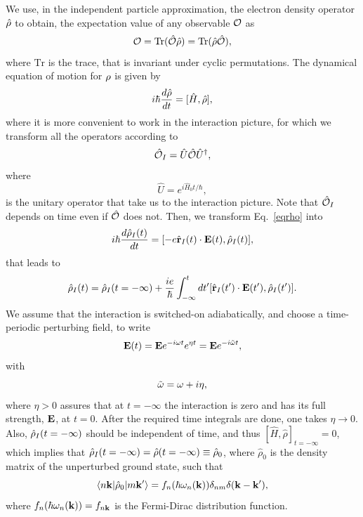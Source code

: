 \documentclass[floatfix,prb,aps,superscriptaddress,11pt,preprint]{revtex4}
\begin{document}
We use, in the independent particle approximation, the electron density
operator $\hat{{\rho}}$ to obtain, the expectation value of any observable
${\cal O}$ as
\begin{equation}\label{traza}
  {\cal O}=\mathrm{Tr}(\hat{{\cal O}}\hat\rho)=\mathrm{Tr}(\hat\rho\hat{{\cal O}}),
\end{equation}
where $\mathrm{Tr}$ is the trace, that is
invariant under cyclic permutations.
The dynamical equation of motion for ${\rho}$ is given by
\begin{equation}\label{eqrho}
i\hbar \frac{d\hat{{\rho}}}{dt}=[\hat{H},\hat{{\rho}}]
,
\end{equation}
where it is more convenient to work in the interaction picture, for
which we transform all the operators according to 
\begin{equation}\label{ip}
\hat{{\cal O}}_I=\hat{U}\hat{{\cal O}}\hat{U}^\dagger,
\end{equation}
where
\begin{equation}\label{ou}
\hat{U}=e^{i\hat{H}_0t/\hbar},
\end{equation}
is the unitary operator that take us to the interaction picture.
Note that $\hat{{\cal O}}_I$ depends on time even if $\hat{{\cal O}}$ does not.
Then, we transform Eq.~\eqref{eqrho} into
\begin{equation}\label{intrho}
i\hbar\frac{d\hat{{\rho}}_I(t)}{dt}=[-e\hat{\mathbf{r}}_I(t)\cdot\mathbf{E}(t),\hat{{\rho}}_I(t)],
\end{equation}
that leads to
\begin{equation}\label{intrho2}
\hat{{\rho}}_I(t)=\hat{{\rho}}_I(t=-\infty)
+
\frac{ie}{\hbar}\int_{-\infty}^t dt'[\hat{\mathbf{r}}_I(t')\cdot\mathbf{E}(t'),\hat{{\rho}}_I(t')].
\end{equation}
We assume that the interaction is switched-on adiabatically, and
choose a time-periodic perturbing field, to write
\begin{equation}\label{efield}
\mathbf{E}(t)=\mathbf{E} e^{-i\omega t}e^{\eta t}=\mathbf{E} e^{-i\tilde\omega t}
,
\end{equation}
with
\begin{equation}\label{got}
\tilde\omega=\omega+i\eta
,
\end{equation} 
where $\eta > 0$ assures
that at $t=-\infty$ the interaction is zero and has its full strength, $\mathbf{E}$,
at $t=0$. After the required time integrals are done, one takes
$\eta\to 0$. 
Also, $\hat{{\rho}}_I(t=-\infty)$ should be independent of time, and thus 
$[\hat{H},\hat\rho]_{t=-\infty}=0$, which implies that 
$\hat{{\rho}}_I(t=-\infty)=\hat\rho(t=-\infty)\equiv\hat\rho_0$,
where $\hat\rho_0$ is
the density matrix of the unperturbed ground state,
such that
\begin{equation}\label{nrhon}
\langle n\mathbf{k} |\hat{{\rho}}_0| m\mathbf{k}' \rangle=f_n(\hbar\omega_n(\mathbf{k}))\delta_{nm}\delta(\mathbf{k}-\mathbf{k}')
,
\end{equation}
where $f_n(\hbar\omega_n(\mathbf{k}))=f_{n\mathbf{k}}$ is the Fermi-Dirac distribution function.
\end{document}
